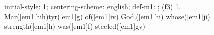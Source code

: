 initial-style: 1;
centering-scheme: english;
def-m1: \grealign;
(f3) 1. Mar([em1]hih)tyr([em1]g) of([em1]iv) God,([em1]hi) whose([em1]ji) strength([em1]h) was([em1]f) steeled([em1]gv)